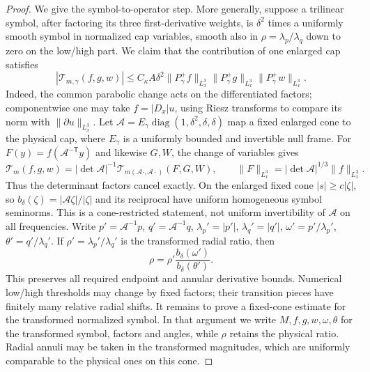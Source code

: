 \documentclass[11pt,a4paper]{article}
\numberwithin{equation}{section}
\newcommand{\f}[2]{\frac{#1}{#2}}
\theoremstyle{definition}
\begin{document}
\begin{proof}
We give the symbol-to-operator step. More generally, suppose a trilinear
symbol, after factoring its three first-derivative weights, is $\delta^2$
times a uniformly smooth symbol in normalized cap variables, smooth also
in $\rho=\lambda_p/\lambda_q$ down to zero on the low/high part.
We claim that the contribution of one enlarged cap satisfies
\begin{equation*}
|\mathcal T_{m,\gamma}(f,g,w)|\leq C_\kappa A\delta^2
\|P_\gamma^+f\|_{L^3_x}\|P_\gamma^+g\|_{L^3_x}\|P_\gamma^+w\|_{L^3_x}.
\end{equation*}
Indeed, the common parabolic change acts on the differentiated factors;
componentwise one may take $f=|D_x|u$, using Riesz transforms to compare
its norm with $\|\partial u\|_{L^3_x}$. Let
$\mathcal A=E_\gamma\operatorname{diag}(1,\delta^2,\delta,\delta)$
map a fixed enlarged cone to the physical cap, where $E_\gamma$ is a
uniformly bounded and invertible null frame. For $F(y)=f(\mathcal A^{-\mathsf T}y)$
and likewise $G,W$, the change of variables gives
\begin{equation*}
\mathcal T_m(f,g,w)=|\det\mathcal A|^{-1}
 \mathcal T_{m(\mathcal A\cdot,\mathcal A\cdot)}(F,G,W),
\qquad \|F\|_{L^3_x}=|\det\mathcal A|^{1/3}\|f\|_{L^3_x}.
\end{equation*}
Thus the determinant factors cancel exactly. On the enlarged fixed cone
$|s|\geq c|\zeta|$, so
$b_\delta(\zeta)=|\mathcal A\zeta|/|\zeta|$ and its reciprocal have
uniform homogeneous symbol seminorms. This is a cone-restricted
statement, not uniform invertibility of $\mathcal A$ on all frequencies.
Write $p'=\mathcal A^{-1}p$, $q'=\mathcal A^{-1}q$,
$\lambda_p'=|p'|$, $\lambda_q'=|q'|$, $\omega'=p'/\lambda_p'$, $\theta'=q'/\lambda_q'$.
If $\rho'=\lambda_p'/\lambda_q'$ is the transformed radial ratio, then
\begin{equation*}
\rho=\rho'\f{b_\delta(\omega')}{b_\delta(\theta')}.
\end{equation*}
This preserves all required endpoint and annular derivative bounds.
Numerical low/high thresholds may change by fixed factors; their
transition pieces have finitely many relative radial shifts. It remains
to prove a fixed-cone estimate for the transformed normalized symbol.
In that argument we write $M,f,g,w,\omega,\theta$ for the transformed
symbol, factors and angles, while $\rho$ retains the physical ratio.
Radial annuli may be taken in the transformed magnitudes, which are
uniformly comparable to the physical ones on this cone.


\end{proof}
\end{document}

